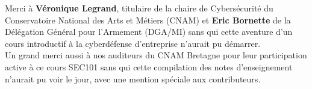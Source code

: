 

\newpage

\thispagestyle{empty}

\begin{center}

\large{Merci à \textbf{Véronique Legrand}, titulaire de la chaire de Cybersécurité du Conservatoire National des Arts et Métiers (CNAM) et \textbf{Eric Bornette} de la Délégation Général pour l'Armement (DGA/MI) sans qui cette aventure d'un cours introductif à la cyberdéfense d'entreprise n'aurait pu démarrer. 
\\ 


Un grand merci aussi à nos auditeurs du CNAM Bretagne pour leur participation active à ce cours SEC101 sans qui cette compilation des notes d'enseignement n'aurait pu voir le jour, avec une mention spéciale aux contributeurs. 
}

\end{center}




\clearpage 


